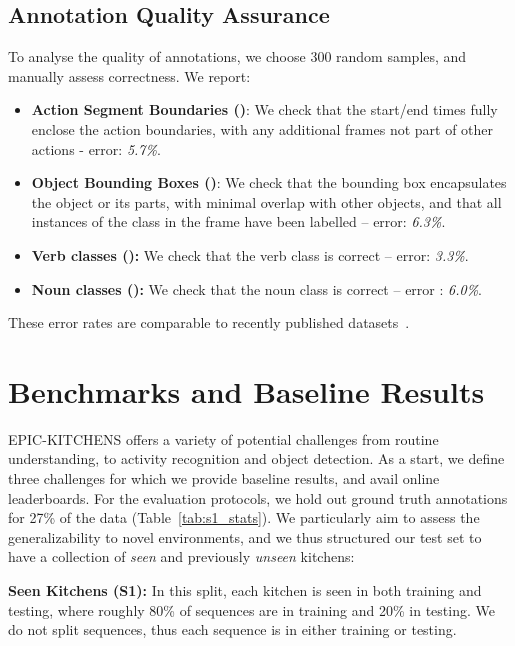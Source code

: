 \documentclass[runningheads]{llncs}
\newcommand{\EPIC}{\textcolor{EPIC-COLOR}{{EPIC-KITCHENS}}}
\begin{document}
\subsection{Annotation Quality Assurance}
To analyse the quality of annotations, we choose  300 random samples, and manually assess correctness. We report:

\begin{itemize}[leftmargin=*]
\item \textbf{Action Segment Boundaries ()}: We check that the start/end times fully enclose the action boundaries, with any additional frames not part of other actions - error: \textit{5.7\%}.
\item \textbf{Object Bounding Boxes ()}: We check that the bounding box encapsulates the object or its parts, with minimal overlap with other objects, and that all instances of the class in the frame have been labelled -- error: \textit{6.3\%}. 
\item \textbf{Verb classes ():} We check that the verb class is correct -- error: \textit{3.3\%}.
\item \textbf{Noun classes ():} We check that the noun class is correct -- error : \textit{6.0\%}.

\end{itemize}
\vspace*{-3pt}

\noindent These error rates are comparable to recently published datasets~\cite{zhao2017slac}.

\section{Benchmarks and Baseline Results}
\label{sec:baselines}


\EPIC{} offers a variety of potential challenges from routine understanding, to activity recognition and object detection. As a start, 
we define three challenges for which we provide baseline results, and avail online leaderboards.
For the evaluation protocols, we hold out ground truth annotations for 27\% of the data (Table~\ref{tab:s1_stats}).
We particularly aim to assess the generalizability to novel environments, and we thus structured our test set to have a collection of \textit{seen} and previously \textit{unseen} kitchens:

\noindent\textbf{Seen Kitchens (S1):} In this split,
each kitchen is seen in both training and testing, where roughly 80\% of sequences are in training and 20\% in testing. We do not split sequences, thus each sequence is in either training or testing. 
\end{document}

